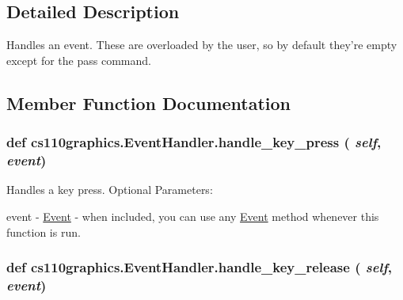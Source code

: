 \subsection{Detailed Description}
Handles an event. These are overloaded by the user, so by default they're empty except for the pass command. 

\subsection{Member Function Documentation}
\hypertarget{classcs110graphics_1_1EventHandler_af3fb3531d0b23f1430a830586cd07906}{
\subsubsection[{handle\_\-key\_\-press}]{\setlength{\rightskip}{0pt plus 5cm}def cs110graphics.EventHandler.handle\_\-key\_\-press ( {\em self}, \/   {\em event})}}
\label{classcs110graphics_1_1EventHandler_af3fb3531d0b23f1430a830586cd07906}


Handles a key press. Optional Parameters:
\begin{DoxyItemize}
\item event -\/ \hyperlink{classcs110graphics_1_1Event}{Event} -\/ when included, you can use any \hyperlink{classcs110graphics_1_1Event}{Event} method whenever this function is run. 
\end{DoxyItemize}\hypertarget{classcs110graphics_1_1EventHandler_a2849f60251baa44252992162521f2473}{
\subsubsection[{handle\_\-key\_\-release}]{\setlength{\rightskip}{0pt plus 5cm}def cs110graphics.EventHandler.handle\_\-key\_\-release ( {\em self}, \/   {\em event})}}
\label{classcs110graphics_1_1EventHandler_a2849f60251baa44252992162521f2473}



